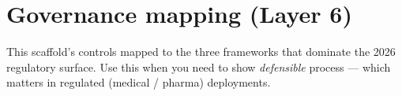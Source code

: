 \documentclass[
  turkish,
  12pt,
  a4paper,
]{report}
\author{}
\date{}
\renewcommand*\contentsname{İçindekiler}
\newcommand\contentsname{İçindekiler}
\renewcommand*\listfigurename{Şekil Listesi}
\newcommand\listfigurename{Şekil Listesi}
\renewcommand*\listtablename{Tablo Listesi}
\newcommand\listtablename{Tablo Listesi}
\begin{document}
\renewcommand{\listfigurename}{ŞEKİLLER DİZİNİ}
\renewcommand{\listtablename}{TABLOLAR DİZİNİ}

\renewcommand*\contentsname{İÇİNDEKİLER}
{
\hypersetup{linkcolor=black}
\setcounter{tocdepth}{2}
\tableofcontents
}
\listoffigures
\listoftables

\chapter{Governance mapping (Layer 6)}\label{governance-mapping-layer-6}

This scaffold's controls mapped to the three frameworks that dominate
the 2026 regulatory surface. Use this when you need to show
\emph{defensible} process --- which matters in regulated (medical /
pharma) deployments.
\end{document}
